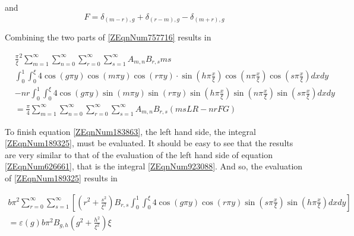 \documentclass{article}
\begin{document}
and
\begin{equation} \label{3.36)} 
    F = \delta _{\left(m-r\right),g} 
    + \delta_{\left(r-m\right),g} - \delta _{\left(m + r\right), g} 
\end{equation}

Combining the two parts of \eqref{ZEqnNum757716} results in

\begin{equation} \label{3.37)} \begin{split} 
    & \frac{\pi }{\xi } ^{2} 
    \sum_{m=1}^{\infty } \sum _{n=0}^{\infty } \sum _{r=0}^{\infty } \sum _{s=1}^{\infty}
        A_{m,n} B_{r,s} m s \\
        & \int _{0}^{1} \int _{0}^{\xi} 4\cos \left(g \pi y\right) \cos \left(m\pi y\right)
            \cos \left(r\pi y\right) \cdot \sin \left( h\pi \frac{x}{\xi } \right)
            \cos \left(n\pi \frac{x}{\xi } \right)
            \cos \left(s\pi \frac{x}{\xi } \right) dxdy \\ 
        & - nr \int_{0}^{1} \int_{0}^{\xi} 4 \cos \left(g \pi y\right) \sin \left(m\pi y\right) 
            \sin \left(r \pi y\right) \sin \left(h\pi \frac{x}{\xi} \right) 
            \sin \left(n\pi \frac{x}{\xi } \right) \sin \left(s\pi \frac{x}{\xi} \right) dxdy \\
    & = \frac{\pi}{4} \sum _{m = 1}^{\infty} \sum_{n=0}^{\infty } \sum _{r=0}^{\infty } \sum _{s=1}^{\infty } 
        A_{m,n} B_{r,s} \left(msLR - nrFG\right)
\end{split} \end{equation} 

To finish equation \eqref{ZEqnNum183863}, the left hand side, the integral
\eqref{ZEqnNum189325}, must be evaluated. It should be easy to see that the
results are very similar to that of the evaluation of the left hand side of
equation \eqref{ZEqnNum626661}, that is the integral \eqref{ZEqnNum923088}. And
so, the evaluation of \eqref{ZEqnNum189325} results in

\begin{equation} \label{3.38)} \begin{array}{l} 
    b \pi ^{2} \sum _{r=0}^{\infty} \sum _{s=1}^{\infty } 
        \left[\left(r^{2} + \frac{s^{2} }{\xi ^{2} } \right) 
        B_{r,s} \int _{0}^{1} \int _{0}^{\xi } 
        4 \cos \left(g\pi y\right) \cos \left(r \pi y\right)
        \sin \left(s\pi \frac{x}{\xi} \right)
        \sin \left(h\pi \frac{x}{\xi} \right) dxdy \right] \\ 
    = \varepsilon (g)b\pi ^{2} B_{g,h} \left(g^{2}
        +\frac{h^{2} }{\xi ^{2} } \right)\xi
\end{array} \end{equation}
\end{document}
